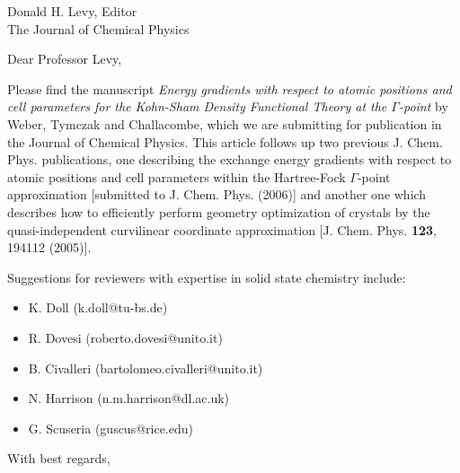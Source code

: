 
\pagestyle{empty}

\signature{V. Weber}

\address{
V. Weber \\
(valeryw@lanl.gov) \\
Theoretical Division \\
Group T-12, MS B268 \\
Los Alamos National Laboratory \\
Los Alamos, NM 87545 }

\date{March 14, 2006}

\begin{letter}{
    Donald H. Levy, Editor \\
    The Journal of Chemical Physics \\
}

\opening{Dear Professor Levy,}

Please find the manuscript 
{\em 
Energy gradients with respect to atomic positions and cell parameters
for the Kohn-Sham Density Functional Theory at the $\Gamma$-point
}
by Weber, Tymczak and Challacombe, which we are 
submitting for publication in the Journal of Chemical Physics. 
This article follows up two previous J. Chem. Phys. publications, one 
describing the 
exchange energy gradients with respect to atomic positions and cell parameters
within the Hartree-Fock $\Gamma$-point approximation [submitted to J. Chem. Phys. (2006)] 
and another one which describes how to efficiently perform geometry optimization of crystals by the 
quasi-independent curvilinear coordinate approximation [J. Chem. Phys. {\bf 123}, 194112 (2005)].

Suggestions for reviewers with expertise in solid state chemistry include: 
\begin{itemize}
\item K. Doll (k.doll@tu-bs.de)
\item R. Dovesi (roberto.dovesi@unito.it)
\item B. Civalleri (bartolomeo.civalleri@unito.it)
\item N. Harrison (n.m.harrison@dl.ac.uk)
\item G. Scuseria (guscus@rice.edu)
\end{itemize}

\closing{With best regards,}
\end{letter}

